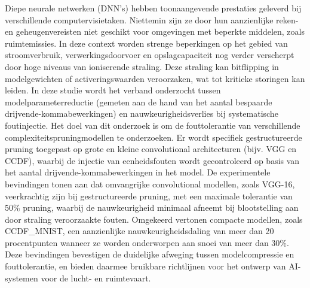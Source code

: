 Diepe neurale netwerken (DNN's) hebben toonaangevende prestaties geleverd bij verschillende computervisietaken. Niettemin zijn ze door hun aanzienlijke reken- en geheugenvereisten niet geschikt voor omgevingen met beperkte middelen, zoals ruimtemissies. In deze context worden strenge beperkingen op het gebied van stroomverbruik, verwerkingsdoorvoer en opslagcapaciteit nog verder verscherpt door hoge niveaus van ioniserende straling. Deze straling kan bitflipping in modelgewichten of activeringswaarden veroorzaken, wat tot kritieke storingen kan leiden. In deze studie wordt het verband onderzocht tussen modelparameterreductie (gemeten aan de hand van het aantal bespaarde drijvende-kommabewerkingen) en nauwkeurigheidsverlies bij systematische foutinjectie. Het doel van dit onderzoek is om de fouttolerantie van verschillende complexiteitspruningmodellen te onderzoeken. Er wordt specifiek gestructureerde pruning toegepast op grote en kleine convolutional architecturen (bijv. VGG en CCDF), waarbij de injectie van eenheidsfouten wordt gecontroleerd op basis van het aantal drijvende-kommabewerkingen in het model. De experimentele bevindingen tonen aan dat omvangrijke convolutional modellen, zoals VGG-16, veerkrachtig zijn bij gestructureerde pruning, met een maximale tolerantie van 50\% pruning, waarbij de nauwkeurigheid minimaal afneemt bij blootstelling aan door straling veroorzaakte fouten. Omgekeerd vertonen compacte modellen, zoals CCDF\_MNIST, een aanzienlijke nauwkeurigheidsdaling van meer dan 20 procentpunten wanneer ze worden onderworpen aan snoei van meer dan 30\%. Deze bevindingen bevestigen de duidelijke afweging tussen modelcompressie en fouttolerantie, en bieden daarmee bruikbare richtlijnen voor het ontwerp van AI-systemen voor de lucht- en ruimtevaart.
